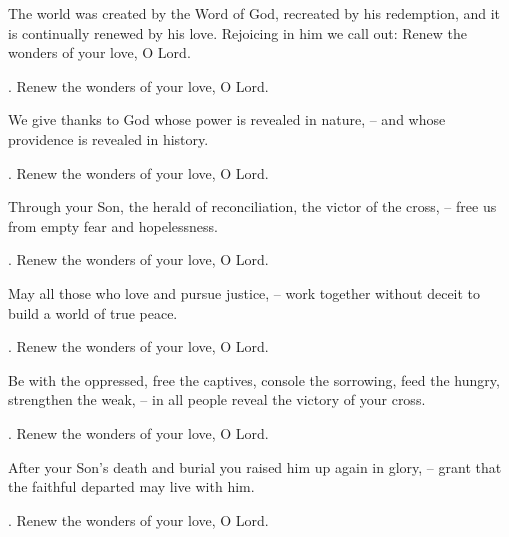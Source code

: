 \lettrine[lines=2]{T}{}he world was created by the Word of God, recreated by his redemption, and it is continually renewed by his love. Rejoicing in him we call out: Renew the wonders of your love, O Lord.
\par \Rbar. Renew the wonders of your love, O Lord.

We give thanks to God whose power is revealed in nature,
– and whose providence is revealed in history.
\par \Rbar. Renew the wonders of your love, O Lord.

Through your Son, the herald of reconciliation, the victor of the cross,
– free us from empty fear and hopelessness.
\par \Rbar. Renew the wonders of your love, O Lord.

May all those who love and pursue justice,
– work together without deceit to build a world of true peace.
\par \Rbar. Renew the wonders of your love, O Lord.

Be with the oppressed, free the captives, console the sorrowing, feed the hungry, strengthen the weak,
– in all people reveal the victory of your cross.
\par \Rbar. Renew the wonders of your love, O Lord.

After your Son’s death and burial you raised him up again in glory,
– grant that the faithful departed may live with him.
\par \Rbar. Renew the wonders of your love, O Lord.

